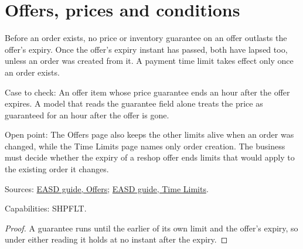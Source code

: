 
\section{Offers, prices and conditions}


\begin{theorem}
  \label{thm:offers-offer-expiry-ends-limits}
  Before an order exists, no price or inventory guarantee on an offer
  outlasts the offer's expiry. Once the offer's expiry instant has passed,
  both have lapsed too, unless an order was created from it. A payment time
  limit takes effect only once an order exists.

  Case to check: An offer item whose price guarantee ends an hour after the
  offer expires. A model that reads the guarantee field alone treats the
  price as guaranteed for an hour after the offer is gone.

  Open point: The Offers page also keeps the other limits alive when an
  order was changed, while the Time Limits page names only order creation.
  The business must decide whether the expiry of a reshop offer ends limits
  that would apply to the existing order it changes.

  Sources: \href{https://standards.atlassian.net/wiki/spaces/EASD/pages/600637464/Offers}{EASD guide, Offers};
  \href{https://standards.atlassian.net/wiki/spaces/EASD/pages/574423066/Time+Limits}{EASD guide, Time Limits}.

  Capabilities: SHPFLT.
\end{theorem}
\begin{proof}
  A guarantee runs until the earlier of its own limit and the offer's
  expiry, so under either reading it holds at no instant after the expiry.
\end{proof}

